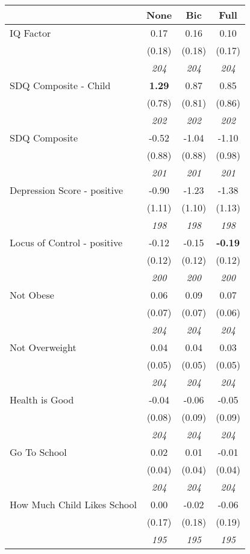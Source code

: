 \begin{tabular}{l c c c}
\toprule
 & None & Bic & Full \\
\midrule
IQ Factor & 0.17 & 0.16 & 0.10 \\
& (0.18) & (0.18) & (0.17) \\
& \textit{ 204 } & \textit{ 204 } & \textit{ 204 } \\
SDQ Composite - Child & \textbf{ 1.29 } & 0.87 & 0.85 \\
& (0.78) & (0.81) & (0.86) \\
& \textit{ 202 } & \textit{ 202 } & \textit{ 202 } \\
SDQ Composite & -0.52 & -1.04 & -1.10 \\
& (0.88) & (0.88) & (0.98) \\
& \textit{ 201 } & \textit{ 201 } & \textit{ 201 } \\
Depression Score - positive & -0.90 & -1.23 & -1.38 \\
& (1.11) & (1.10) & (1.13) \\
& \textit{ 198 } & \textit{ 198 } & \textit{ 198 } \\
Locus of Control - positive & -0.12 & -0.15 & \textbf{ -0.19 } \\
& (0.12) & (0.12) & (0.12) \\
& \textit{ 200 } & \textit{ 200 } & \textit{ 200 } \\
Not Obese & 0.06 & 0.09 & 0.07 \\
& (0.07) & (0.07) & (0.06) \\
& \textit{ 204 } & \textit{ 204 } & \textit{ 204 } \\
Not Overweight & 0.04 & 0.04 & 0.03 \\
& (0.05) & (0.05) & (0.05) \\
& \textit{ 204 } & \textit{ 204 } & \textit{ 204 } \\
Health is Good & -0.04 & -0.06 & -0.05 \\
& (0.08) & (0.09) & (0.09) \\
& \textit{ 204 } & \textit{ 204 } & \textit{ 204 } \\
Go To School & 0.02 & 0.01 & -0.01 \\
& (0.04) & (0.04) & (0.04) \\
& \textit{ 204 } & \textit{ 204 } & \textit{ 204 } \\
How Much Child Likes School & 0.00 & -0.02 & -0.06 \\
& (0.17) & (0.18) & (0.19) \\
& \textit{ 195 } & \textit{ 195 } & \textit{ 195 } \\

\end{tabular}
